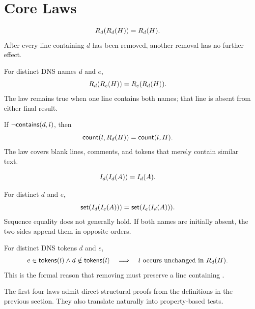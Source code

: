 \section{Core Laws}

\begin{law}
\label{law:remove-idempotent}
\[
  R_{d}(R_{d}(H))=R_{d}(H).
\]
After every line containing $d$ has been removed, another removal has no
further effect.
\end{law}

\begin{law}
\label{law:remove-commute}
For distinct DNS names $d$ and $e$,
\[
  R_{d}(R_{e}(H))=R_{e}(R_{d}(H)).
\]
The law remains true when one line contains both names; that line is absent
from either final result.
\end{law}

\begin{law}
\label{law:preservation}
If $\neg\mathsf{contains}(d,l)$, then
\[
  \mathsf{count}(l,R_{d}(H))=\mathsf{count}(l,H).
\]
The law covers blank lines, comments, and tokens that merely contain similar
text.
\end{law}

\begin{law}
\label{law:insert-idempotent}
\[
  I_{d}(I_{d}(A))=I_{d}(A).
\]
\end{law}

\begin{law}
\label{law:insert-commute}
For distinct $d$ and $e$,
\[
  \mathsf{set}(I_{d}(I_{e}(A)))
  =\mathsf{set}(I_{e}(I_{d}(A))).
\]
Sequence equality does not generally hold.  If both names are initially
absent, the two sides append them in opposite orders.
\end{law}

\begin{law}[Exactness]
\label{law:exactness}
For distinct DNS tokens $d$ and $e$,
\[
  e\in\mathsf{tokens}(l)\land d\notin\mathsf{tokens}(l)
  \quad\Longrightarrow\quad
  l\text{ occurs unchanged in }R_{d}(H).
\]
This is the formal reason that removing  must preserve a
line containing .
\end{law}

The first four laws admit direct structural proofs from the definitions in the
previous section.  They also translate naturally into property-based tests.
